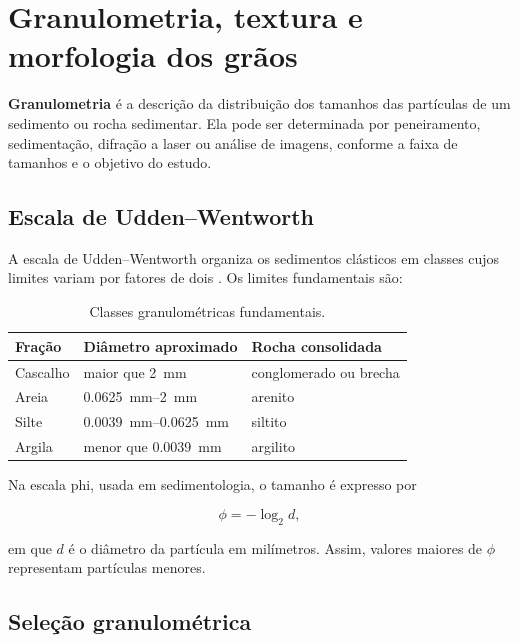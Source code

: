 \section{Granulometria, textura e morfologia dos grãos}

\begin{definicao}
\textbf{Granulometria} é a descrição da distribuição dos tamanhos das partículas de um sedimento ou rocha sedimentar. Ela pode ser determinada por peneiramento, sedimentação, difração a laser ou análise de imagens, conforme a faixa de tamanhos e o objetivo do estudo.
\end{definicao}

\subsection{Escala de Udden--Wentworth}

A escala de Udden--Wentworth organiza os sedimentos clásticos em classes cujos limites variam por fatores de dois \parencite{wentworth1922}. Os limites fundamentais são:

\begin{table}[H]
  \centering
  \caption{Classes granulométricas fundamentais.}
  \label{tab:wentworth-resumo}
  \begin{tabular}{lll}
    \toprule
    \textbf{Fração} & \textbf{Diâmetro aproximado} & \textbf{Rocha consolidada} \\
    \midrule
    Cascalho & maior que \SI{2}{\milli\metre} & conglomerado ou brecha \\
    Areia    & \SIrange{0.0625}{2}{\milli\metre} & arenito \\
    Silte    & \SIrange{0.0039}{0.0625}{\milli\metre} & siltito \\
    Argila   & menor que \SI{0.0039}{\milli\metre} & argilito \\
    \bottomrule
  \end{tabular}
\end{table}

Na escala phi, usada em sedimentologia, o tamanho é expresso por

\[
\phi=-\log_2 d,
\]

em que \(d\) é o diâmetro da partícula em milímetros. Assim, valores maiores de \(\phi\) representam partículas menores.

\subsection{Seleção granulométrica}


